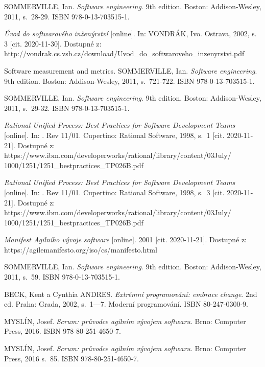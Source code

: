 \documentclass[czech,master,public,dept460,male,cpdeclaration,oneside]{diploma}
\begin{document}
\begin{thebibliography}{43}

SOMMERVILLE, Ian. \textit{Software engineering}. 9th edition. Boston: Addison-Wesley, 2011, s.~28-29. ISBN 978-0-13-703515-1.

\textit{Úvod do softwarového inženýrství} [online]. In: VONDRÁK, Ivo. Ostrava, 2002, s. 3 [cit. 2020-11-30]. Dostupné z: http://vondrak.cs.vsb.cz/download/Uvod\_do\_softwaroveho\_inzenyrstvi.pdf

Software measurement and metrics. SOMMERVILLE, Ian. \textit{Software engineering}. 9th edition. Boston: Addison-Wesley, 2011, s.~721-722. ISBN 978-0-13-703515-1.

SOMMERVILLE, Ian. \textit{Software engineering}. 9th edition. Boston: Addison-Wesley, 2011, s.~29-32. ISBN 978-0-13-703515-1.

\textit{Rational Unified Process: Best Practices for Software Development Teams} [online]. In: . Rev 11/01. Cupertino: Rational Software, 1998, s.~1 [cit. 2020-11-21]. Dostupné z: https://www.ibm.com/developerworks/rational/library/content/03July/
1000/1251/1251\_bestpractices\_TP026B.pdf

\textit{Rational Unified Process: Best Practices for Software Development Teams} [online]. In: . Rev 11/01. Cupertino: Rational Software, 1998, s.~3 [cit. 2020-11-21]. Dostupné z: https://www.ibm.com/developerworks/rational/library/content/03July/
1000/1251/1251\_bestpractices\_TP026B.pdf

\textit{Manifest Agilního vývoje software} [online]. 2001 [cit. 2020-11-21]. Dostupné z: https://agilemanifesto.org/iso/cs/manifesto.html

SOMMERVILLE, Ian. \textit{Software engineering}. 9th edition. Boston: Addison-Wesley, 2011, s.~59. ISBN 978-0-13-703515-1.

BECK, Kent a Cynthia ANDRES. \textit{Extrémní programování: embrace change}. 2nd ed. Praha: Grada, 2002, s.~1---7. Moderní programování. ISBN 80-247-0300-9.

MYSLÍN, Josef. \textit{Scrum: průvodce agilním vývojem softwaru}. Brno: Computer Press, 2016. ISBN 978-80-251-4650-7.

MYSLÍN, Josef. \textit{Scrum: průvodce agilním vývojem softwaru}. Brno: Computer Press, 2016 s.~85. ISBN 978-80-251-4650-7.


\end{thebibliography}
\end{document}
